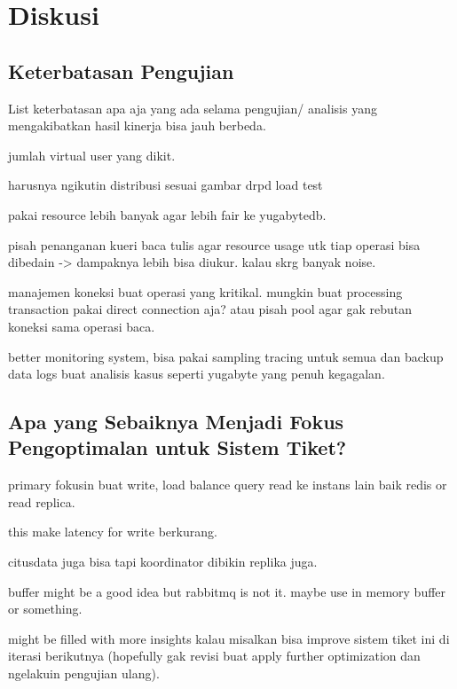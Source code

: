 \section{Diskusi}

\subsection{Keterbatasan Pengujian}

List keterbatasan apa aja yang ada selama pengujian/ analisis yang mengakibatkan hasil kinerja bisa jauh berbeda.

jumlah virtual user yang dikit.

harusnya ngikutin distribusi sesuai gambar drpd load test

pakai resource lebih banyak agar lebih fair ke yugabytedb.

pisah penanganan kueri baca tulis agar resource usage utk tiap operasi bisa dibedain -> dampaknya lebih bisa diukur. kalau skrg banyak noise.

manajemen koneksi buat operasi yang kritikal. mungkin buat processing transaction pakai direct connection aja? atau pisah pool agar gak rebutan koneksi sama operasi baca.

better monitoring system, bisa pakai sampling tracing untuk semua dan backup data logs buat analisis kasus seperti yugabyte yang penuh kegagalan.

\subsection{Apa yang Sebaiknya Menjadi Fokus Pengoptimalan untuk Sistem Tiket?}

primary fokusin buat write, load balance query read ke instans lain baik redis or read replica.

this make latency for write berkurang.

citusdata juga bisa tapi koordinator dibikin replika juga.

buffer might be a good idea but rabbitmq is not it. maybe use in memory buffer or something.

might be filled with more insights kalau misalkan bisa improve sistem tiket ini di iterasi berikutnya (hopefully gak revisi buat apply further optimization dan ngelakuin pengujian ulang).
